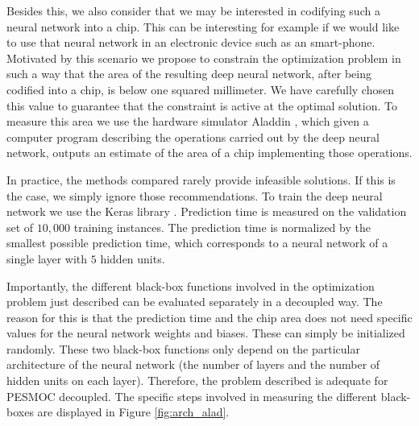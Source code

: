 \documentclass[review,preprint,12pt]{elsarticle}
\begin{document}
Besides this, we also consider that we may be interested in codifying such a neural network into a chip. This can be 
interesting for example if we would like to use that neural network in an electronic device such as an smart-phone.
Motivated by this scenario we propose to constrain the optimization problem in such a way that the area of the
resulting deep neural network, after being codified into a chip, is below one squared millimeter. 
We have carefully chosen this value to guarantee that the constraint is active at the optimal solution. 
To measure this area we use the  hardware simulator Aladdin \citep{shao2014aladdin}, which given 
a computer program describing the operations carried out 
by the deep neural network, outputs an estimate of the area of a chip implementing those 
operations.  

In practice, the methods compared rarely provide infeasible solutions. If this is the case, we simply ignore those 
recommendations. To train the deep neural network we use the Keras library \citep{chollet2015keras}. 
Prediction time is measured on the validation set of $10,000$ training instances.  
The prediction time is normalized by the smallest possible prediction time, which corresponds to 
a neural network of a single layer with $5$ hidden units. 

Importantly, the different black-box functions involved in the optimization problem just described can be 
evaluated separately in a decoupled way. The reason for this is that the prediction time and the chip 
area does not need specific values for the neural network weights and biases. These can simply be 
initialized randomly. These two black-box functions only depend on the particular architecture of the 
neural network (the number of layers and the number of hidden units on each layer). Therefore, the problem described 
is adequate for PESMOC decoupled. The specific steps involved in measuring the different black-boxes are 
displayed in Figure \ref{fig:arch_alad}.

\end{document}
